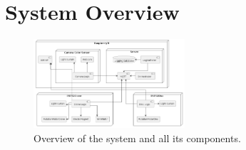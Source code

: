 \section{System Overview}\label{appendix:system-overview}

\begin{figure}[H]
    \centering
    \includegraphics[width=0.5\textwidth]{Image/infrastructure-v3.png}
    \caption{Overview of the system and all its components.}
    \label{fig:system-overview}
\end{figure}